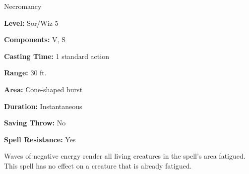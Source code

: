 
Necromancy

\textbf{Level:} Sor/Wiz 5

\textbf{Components:} V, S

\textbf{Casting Time:} 1 standard action

\textbf{Range:} 30 ft.

\textbf{Area:} Cone-shaped burst

\textbf{Duration:} Instantaneous

\textbf{Saving Throw:} No

\textbf{Spell Resistance:} Yes

Waves of negative energy render all living creatures in the spell's area fatigued. 
This spell has no effect on a creature that is already fatigued.

